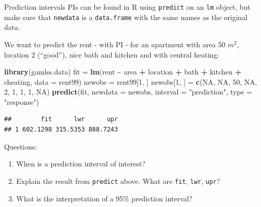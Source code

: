 \documentclass[
  ignorenonframetext,
]{beamer}
\newenvironment{Shaded}{\begin{snugshade}}{\end{snugshade}}
\newcommand{\AttributeTok}[1]{\textcolor[rgb]{0.13,0.29,0.53}{#1}}
\newcommand{\ConstantTok}[1]{\textcolor[rgb]{0.56,0.35,0.01}{#1}}
\newcommand{\DecValTok}[1]{\textcolor[rgb]{0.00,0.00,0.81}{#1}}
\newcommand{\FunctionTok}[1]{\textcolor[rgb]{0.13,0.29,0.53}{\textbf{#1}}}
\newcommand{\NormalTok}[1]{#1}
\newcommand{\OtherTok}[1]{\textcolor[rgb]{0.56,0.35,0.01}{#1}}
\newcommand{\SpecialCharTok}[1]{\textcolor[rgb]{0.81,0.36,0.00}{\textbf{#1}}}
\newcommand{\StringTok}[1]{\textcolor[rgb]{0.31,0.60,0.02}{#1}}
\begin{document}
\begin{frame}[fragile]{Prediction intervals}
\label{prediction-intervals-4}
PIs can be found in R using \texttt{predict} on an \texttt{lm} object,
but make sure that \texttt{newdata} is a \texttt{data.frame} with the
same names as the original data.

We want to predict the rent - with PI - for an apartment with area 50
\(m^2\), location 2 (``good''), nice bath and kitchen and with central
heating:

\begin{Shaded}
\begin{Highlighting}[]
\FunctionTok{library}\NormalTok{(gamlss.data)}
\NormalTok{fit }\OtherTok{=} \FunctionTok{lm}\NormalTok{(rent }\SpecialCharTok{\textasciitilde{}}\NormalTok{ area }\SpecialCharTok{+}\NormalTok{ location }\SpecialCharTok{+}\NormalTok{ bath }\SpecialCharTok{+}\NormalTok{ kitchen }\SpecialCharTok{+}\NormalTok{ cheating, }\AttributeTok{data =}\NormalTok{ rent99)}
\NormalTok{newobs }\OtherTok{=}\NormalTok{ rent99[}\DecValTok{1}\NormalTok{, ]}
\NormalTok{newobs[}\DecValTok{1}\NormalTok{, ] }\OtherTok{=} \FunctionTok{c}\NormalTok{(}\ConstantTok{NA}\NormalTok{, }\ConstantTok{NA}\NormalTok{, }\DecValTok{50}\NormalTok{, }\ConstantTok{NA}\NormalTok{, }\DecValTok{2}\NormalTok{, }\DecValTok{1}\NormalTok{, }\DecValTok{1}\NormalTok{, }\DecValTok{1}\NormalTok{, }\ConstantTok{NA}\NormalTok{)}
\FunctionTok{predict}\NormalTok{(fit, }\AttributeTok{newdata =}\NormalTok{ newobs, }\AttributeTok{interval =} \StringTok{"prediction"}\NormalTok{, }\AttributeTok{type =} \StringTok{"response"}\NormalTok{)}
\end{Highlighting}
\end{Shaded}

\begin{verbatim}
##        fit      lwr      upr
## 1 602.1298 315.5353 888.7243
\end{verbatim}
\end{frame}

\begin{frame}[fragile]{Questions:}
\label{questions}
\begin{enumerate}
\item
  {When is a prediction interval of interest? }
\item
  {Explain the result from \texttt{predict} above. What are
  \texttt{fit}, \texttt{lwr}, \texttt{upr}?}
\item
  {What is the interpretation of a 95\% prediction interval? }
\end{enumerate}
\end{frame}
\end{document}
